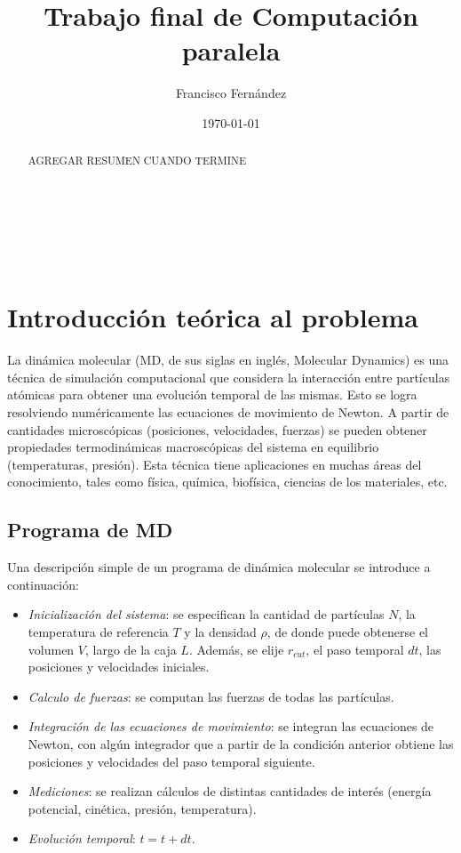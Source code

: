 \documentclass[a4paper,spanish,12pt,twoside]{article}
\title{Trabajo final de Computación paralela}
\author{Francisco Fernández}
\date{\today}
\begin{document}
\maketitle

\

\

\begin{abstract}

AGREGAR RESUMEN CUANDO TERMINE

\end{abstract}


\section{Introducción teórica al problema}

La dinámica molecular (MD, de sus siglas en inglés, Molecular Dynamics) es una técnica de simulación computacional que considera la interacción entre partículas atómicas para obtener una evolución temporal de las mismas. Esto se logra resolviendo numéricamente las ecuaciones de movimiento de Newton. A partir de cantidades microscópicas (posiciones, velocidades, fuerzas) se pueden obtener propiedades termodinámicas macroscópicas del sistema en equilibrio (temperaturas, presión). Esta técnica tiene aplicaciones en muchas áreas del conocimiento, tales como física, química, biofísica, ciencias de los materiales, etc.

\subsection{Programa de MD}

Una descripción simple de un programa de dinámica molecular se introduce a continuación:

\begin{itemize}
 \item \textit{Inicialización del sistema}: se especifican la cantidad de partículas $N$, la temperatura de referencia $T$ y la densidad $\rho$, de donde puede obtenerse el volumen $V$, largo de la caja $L$. Además, se elije $r_{cut}$, el paso temporal $dt$, las posiciones y velocidades iniciales.
 \item \textit{Calculo de fuerzas}: se computan las fuerzas de todas las partículas.
 \item \textit{Integración de las ecuaciones de movimiento}: se integran las ecuaciones de Newton, con algún integrador que a partir de la condición anterior obtiene las posiciones y velocidades del paso temporal siguiente.
 \item \textit{Mediciones}: se realizan cálculos de distintas cantidades de interés (energía potencial, cinética, presión, temperatura).
 \item \textit{Evolución temporal}: $t = t + dt$.
\end{itemize}
\end{document}
